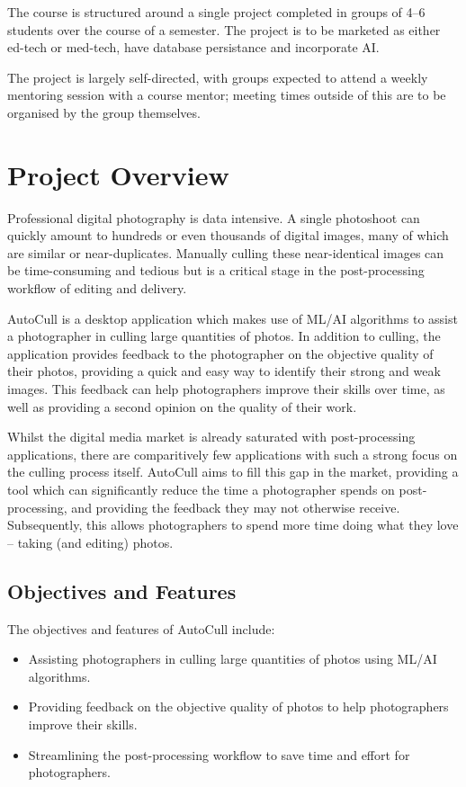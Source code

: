 \documentclass[conference]{IEEEtran}
\begin{document}
The course is structured around a single project completed in groups of 4–6 students over the course of a semester. The project is to be marketed as either ed-tech or med-tech, have database persistance and incorporate AI.

The project is largely self-directed, with groups expected to attend a weekly mentoring session with a course mentor; meeting times outside of this are to be organised by the group themselves.


\section{Project Overview}
Professional digital photography is data intensive. A single photoshoot can quickly amount to hundreds or even thousands of digital images, many of which are similar or near-duplicates. Manually culling these near-identical images can be time-consuming and tedious but is a critical stage in the post-processing workflow of editing and delivery. 

AutoCull is a desktop application which makes use of ML/AI algorithms to assist a photographer in culling large quantities of photos. In addition to culling, the application provides feedback to the photographer on the objective quality of their photos, providing a quick and easy way to identify their strong and weak images. This feedback can help photographers improve their skills over time, as well as providing a second opinion on the quality of their work.

Whilst the digital media market is already saturated with post-processing applications, there are comparitively few applications with such a strong focus on the culling process itself. AutoCull aims to fill this gap in the market, providing a tool which can significantly reduce the time a photographer spends on post-processing, and providing the feedback they may not otherwise receive. Subsequently, this allows photographers to spend more time doing what they love – taking (and editing) photos.

\subsection{Objectives and Features}
The objectives and features of AutoCull include:

\begin{itemize}
    \item Assisting photographers in culling large quantities of photos using ML/AI algorithms.
    \item Providing feedback on the objective quality of photos to help photographers improve their skills.
    \item Streamlining the post-processing workflow to save time and effort for photographers.
\end{itemize}
\end{document}
